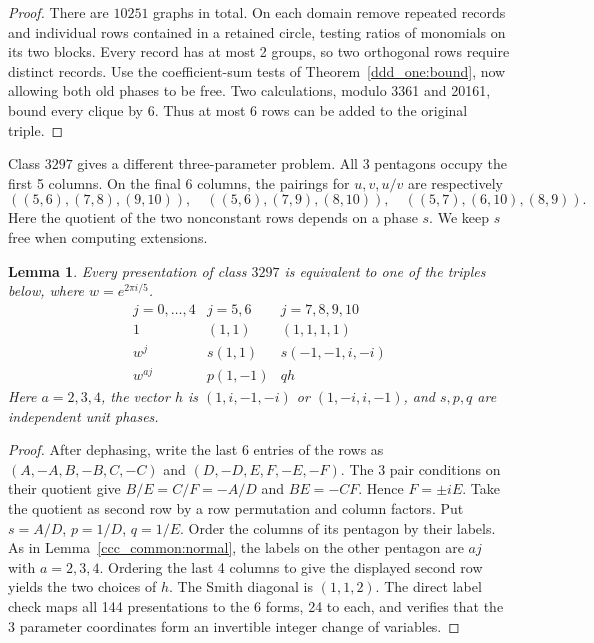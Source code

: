 \documentclass[11pt,a4paper]{article}
\newtheorem{lemma}[theorem]{Lemma}
\theoremstyle{plain}
\theoremstyle{definition}
\theoremstyle{plain}
\begin{document}
\begin{proof}
There are $10251$ graphs in total. On each domain remove repeated records and individual rows contained in a retained circle, testing ratios of monomials on its two blocks. Every record has at most 2 groups, so two orthogonal rows require distinct records. Use the coefficient-sum tests of Theorem~\ref{ddd_one:bound}, now allowing both old phases to be free. Two calculations, modulo 3361 and 20161, bound every clique by 6. Thus at most 6 rows can be added to the original triple.
\end{proof}

Class $3297$ gives a different three-parameter problem. All 3 pentagons occupy the first 5 columns. On the final 6 columns, the pairings for $u,v,u/v$ are respectively
$$((5,6),(7,8),(9,10)),\quad ((5,6),(7,9),(8,10)),\quad
((5,7),(6,10),(8,9)).$$
Here the quotient of the two nonconstant rows depends on a phase $s$. We keep $s$ free when computing extensions.

\par\addvspace{\medskipamount}\noindent
\begin{minipage}{\linewidth}
\begin{lemma}\label{ddd_pilots:normal}
Every presentation of class $3297$ is equivalent to one of the triples below, where $w=e^{2\pi i/5}$.
$$\begin{array}{c|c|c}
j=0,\ldots,4& j=5,6 & j=7,8,9,10\\\hline
1&(1,1)&(1,1,1,1)\\
w^j&s(1,1)&s(-1,-1,i,-i)\\
w^{aj}&p(1,-1)&q h
\end{array}$$
Here $a=2,3,4$, the vector $h$ is $(1,i,-1,-i)$ or $(1,-i,i,-1)$, and $s,p,q$ are independent unit phases.
\end{lemma}
\end{minipage}
\par\addvspace{\medskipamount}

\begin{proof}
After dephasing, write the last 6 entries of the rows as $(A,-A,B,-B,C,-C)$ and $(D,-D,E,F,-E,-F)$. The 3 pair conditions on their quotient give $B/E=C/F=-A/D$ and $BE=-CF$. Hence $F=\pm iE$. Take the quotient as second row by a row permutation and column factors. Put $s=A/D$, $p=1/D$, $q=1/E$. Order the columns of its pentagon by their labels. As in Lemma~\ref{ccc_common:normal}, the labels on the other pentagon are $aj$ with $a=2,3,4$. Ordering the last 4 columns to give the displayed second row yields the two choices of $h$. The Smith diagonal is $(1,1,2)$. The direct label check maps all 144 presentations to the 6 forms, 24 to each, and verifies that the 3 parameter coordinates form an invertible integer change of variables.
\end{proof}
\end{document}
